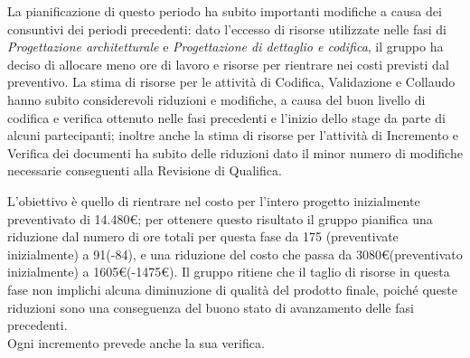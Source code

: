 La pianificazione di questo periodo ha subito importanti modifiche a causa dei consuntivi dei periodi precedenti: dato l'eccesso di risorse utilizzate nelle fasi di \textit{Progettazione architetturale} e \textit{Progettazione di dettaglio e codifica}, il gruppo ha deciso di allocare meno ore di lavoro e risorse per rientrare nei costi previsti dal preventivo.
La stima di risorse per le attività di Codifica, Validazione e Collaudo hanno subito considerevoli riduzioni e modifiche, a causa del buon livello di codifica e verifica ottenuto nelle fasi precedenti e l'inizio dello stage da parte di alcuni partecipanti; inoltre anche la stima di risorse per l'attività di Incremento e Verifica dei documenti ha subito delle riduzioni dato il minor numero di modifiche necessarie conseguenti alla Revisione di Qualifica.

L'obiettivo è quello di rientrare nel costo per l'intero progetto inizialmente preventivato di 14.480\euro; per ottenere questo risultato il gruppo pianifica una riduzione dal numero di ore totali per questa fase da 175 (preventivate inizialmente) a 91(-84), e una riduzione del costo che passa da 3080\euro (preventivato inizialmente) a 1605\euro(-1475\euro).
Il gruppo ritiene che il taglio di risorse in questa fase non implichi alcuna diminuzione di qualità del prodotto finale, poiché queste riduzioni sono una conseguenza del buono stato di avanzamento delle fasi precedenti.  \\

Ogni incremento prevede anche la sua verifica. \\

